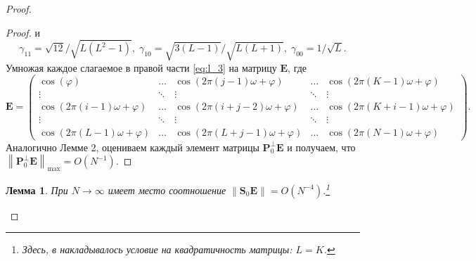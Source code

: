 \documentclass[specialist,
               substylefile = spbu_report.rtx,
               subf,href,colorlinks=true, 12pt]{disser}
\newcommand\norm[1]{\left\|#1\right\|}
\newtheorem{lemma}{Лемма}
\begin{document}
\begin{proof}
\begin{proof}
	и
	\begin{equation*}
		\gamma_{11}=\sqrt{12}/\sqrt{L(L^2-1)},\;\gamma_{10}=\sqrt{3(L-1)}/\sqrt{L(L+1)},\;\gamma_{00}=1/\sqrt{L}.
	\end{equation*}
	Умножая каждое слагаемое в правой части \eqref{eq:l_3} на матрицу $\mathbf{E}$, где
	\begin{equation*}
		\mathbf{E}=
		\begin{pmatrix}
			\cos(\varphi)&\dots&\cos(2\pi(j-1)\omega + \varphi)&\dots&\cos(2\pi(K-1)\omega + \varphi)\\
			\vdots&\ddots&\vdots&\ddots&\vdots\\
			\cos(2\pi(i-1)\omega + \varphi)&\dots&\cos(2\pi(i+j-2)\omega + \varphi)&\dots&\cos(2\pi(K+i-1)\omega+\varphi)\\
			\vdots&\ddots&\vdots&\ddots&\vdots\\
			\cos(2\pi(L-1)\omega+\varphi)&\dots&\cos(2\pi(L+j-1)\omega+\varphi)&\dots&\cos(2\pi(N-1)\omega + \varphi)
		\end{pmatrix}
		.
	\end{equation*}
	Аналогично Лемме 2, оцениваем каждый элемент матрицы $\mathbf{P}_0^\bot\mathbf{E}$ и получаем, что \linebreak $\norm{\mathbf{P}_0^\bot\mathbf{E}}_{\max}=O(N^{-1})$.
\end{proof}

\begin{lemma}
	При $N\rightarrow\infty$ имеет место соотношение $\norm{\mathbf{S}_0\mathbf{E}}=O(N^{-4}).$\footnote{Здесь, в \cite{ZNekrutkin} накладывалось условие на квадратичность матрицы: $L = K$.}
\end{lemma}


\end{proof}
\end{document}
